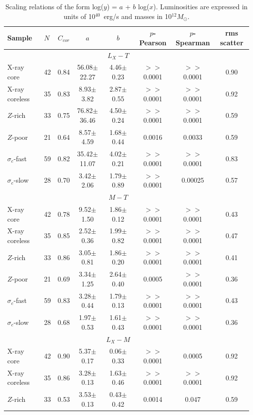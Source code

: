 \documentclass[iop]{emulateapj}
\begin{document}
\begin{table}
\centering
\caption{Scaling relations of the form log($y$) = $a$ + $b$ log($x$). Luminosities are expressed in units of 10$^{40}$~erg/s and masses in 10$^{12}M_{\odot}$.}\label{tab_res_subs}
\begin{tabular}{llcccccc}
\hline
Sample & $N$ &  $C_{cor}$ & $a$ & $b$ & $p$-Pearson & $p$-Spearman & rms scatter \\
\hline
       &  & &   & $L_X-T$  \\
\hline
X-ray core & 42 & 0.84 & 56.08$\pm$22.27 & 4.46$\pm$0.23 & $>>$0.0001 & $>>$0.0001 & 0.90 \\
X-ray coreless & 35 & 0.83 & 8.93$\pm$3.82 & 2.87$\pm$0.55 & $>>$0.0001 & $>>$0.0001 & 0.92 \\
$Z$-rich & 33 & 0.75 & 76.82$\pm$36.46 &  4.50$\pm$0.24 & $>>$0.0001 & $>>$0.0001 & 0.59 \\
$Z$-poor & 21 & 0.64 & 8.57$\pm$4.59 & 1.68$\pm$0.44 & 0.0016 & 0.0033 & 0.59 \\
$\sigma_c$-fast & 59 & 0.82 & 35.42$\pm$11.07 & 4.02$\pm$0.21 & $>>$0.0001 & $>>$0.0001 & 0.83 \\
$\sigma_c$-slow & 28 & 0.70 & 3.42$\pm$2.06 & 1.79$\pm$0.89 & $>>$0.0001 & 0.00025 & 0.57 \\
\hline
 &&&& $M-T$ &&\\
\hline
X-ray core & 42 & 0.78 & 9.52$\pm$1.50 & 1.86$\pm$0.12 & $>>$0.0001 & $>>$0.0001 & 0.43 \\
X-ray coreless & 35 & 0.85 & 2.52$\pm$0.36 & 1.99$\pm$0.82 & $>>$0.0001 & $>>$0.0001 & 0.47 \\
$Z$-rich & 33 & 0.86 & 3.05$\pm$0.81 & 1.86$\pm$0.20 & $>>$0.0001 & $>>$0.0001 & 0.41 \\
$Z$-poor & 21 & 0.69 & 3.34$\pm$1.25 & 2.64$\pm$0.40 & 0.0005 & $>>$0.0001 & 0.36 \\
$\sigma_c$-fast & 59 & 0.83 & 3.28$\pm$0.44 & 1.79$\pm$0.13 & $>>$0.0001 & $>>$0.0001 & 0.43 \\
$\sigma_c$-slow & 28 & 0.68 & 1.97$\pm$0.53 & 1.61$\pm$0.43 & $>>$0.0001 & $>>$0.0001 & 0.36 \\
\hline
&&&&$L_X-M$ &&\\
\hline
X-ray core & 42 & 0.90 & 5.37$\pm$0.17 & 0.06$\pm$0.33 & $>>$0.0001 & 0.0005 & 0.92 \\
X-ray coreless & 35 & 0.86 & 3.28$\pm$0.13 & 1.63$\pm$0.46 & $>>$0.0001 & $>>$0.0001 & 0.92 \\
$Z$-rich & 33 & 0.53 & 3.53$\pm$0.13 & 0.43$\pm$0.42 & 0.0014 & 0.047 & 0.59 \\

\end{tabular}
\end{table}
\end{document}
